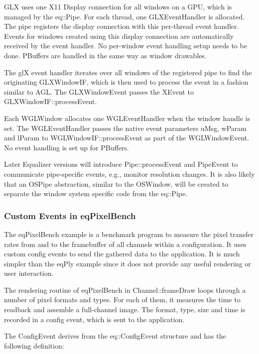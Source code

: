 \documentclass[10pt,a4]{scrartcl}
\begin{document}
GLX uses one X11 Display connection for all windows on a GPU, which is
managed by the \textsf{eq::Pipe}. For each thread, one
\textsf{GLXEventHandler} is allocated. The pipe registers the display
connection with this per-thread event handler. Events for windows
created using this display connection are automatically received by the
event handler. No per-window event handling setup needs to be
done. PBuffers are handled in the same way as window drawables.

The glX event handler iterates over all windows of the registered pipe
to find the originating \textsf{GLXWindowIF}, which is then used to
process the event in a fashion similar to AGL. The
\textsf{GLXWindowEvent} passes the \textsf{XEvent} to
\textsf{GLXWindowIF::\-process\-Event}.

Each \textsf{WGLWindow} allocates one \textsf{WGLEventHandler} when the
window handle is set. The WGLEventHandler passes the native event
parameters \textsf{uMsg}, \textsf{wParam} and \textsf{lParam} to
\textsf{WGL\-Win\-dowIF::processEvent} as part of the
\textsf{WGLWindowEvent}. No event handling is set up for PBuffers.

Later Equalizer versions will introduce \textsf{Pipe::pro\-cess\-Event} and
\textsf{PipeEvent} to communicate pipe-specific events, e.g., monitor
resolution changes. It is also likely that an \textsf{OSPipe}
abstraction, similar to the \textsf{OSWindow}, will be created to
separate the window system specific code from the \textsf{eq::Pipe}.


\subsubsection{Custom Events in eqPixelBench}

The \textsf{eqPixelBench} example is a benchmark program to measure the
pixel transfer rates from and to the framebuffer of all channels within
a configuration. It uses custom config events to send the gathered data
to the application. It is much simpler than the \textsf{eqPly} example
since it does not provide any useful rendering or user interaction.

The rendering routine of \textsf{eqPixelBench} in
\textsf{Channel::frameDraw} loops through a number of pixel formats and
types. For each of them, it measures the time to readback and assemble a
full-channel image. The format, type, size and time is recorded in a
config event, which is sent to the application.

The \textsf{ConfigEvent} derives from the \textsf{eq::ConfigEvent}
structure and has the following definition:
\end{document}
